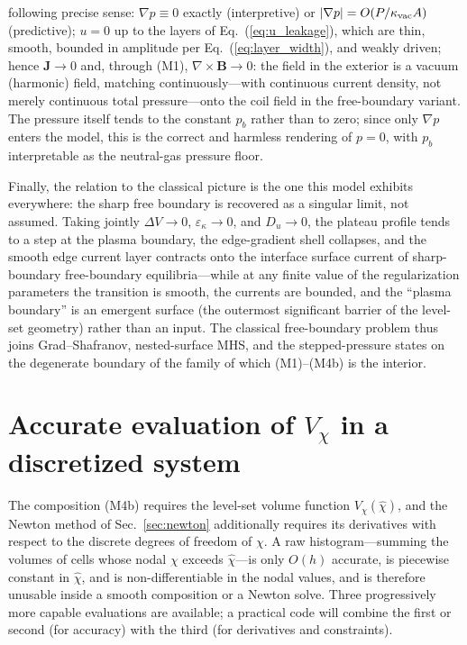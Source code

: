 \documentclass[english]{article}
\newcommand{\bB}{\mathbf{B}}
\newcommand{\bJ}{\mathbf{J}}
\begin{document}
following precise sense: $\nabla p\equiv0$ exactly (interpretive) or
$|\nabla p|=O(P/\kappa_{\rm vac}A)$ (predictive); $u=0$ up to the layers of
Eq.~(\ref{eq:u_leakage}), which are thin, smooth, bounded in amplitude per
Eq.~(\ref{eq:layer_width}), and weakly driven; hence $\bJ\rightarrow0$ and, through (M1),
$\nabla\times\bB\rightarrow0$: the field in the exterior is a vacuum (harmonic) field, matching
continuously---with continuous current density, not merely continuous total pressure---onto the
coil field in the free-boundary variant. The pressure itself tends to the constant $p_b$ rather
than to zero; since only $\nabla p$ enters the model, this is the correct and harmless rendering
of $p=0$, with $p_b$ interpretable as the neutral-gas pressure floor.

Finally, the relation to the classical picture is the one this model exhibits everywhere: the
sharp free boundary is recovered as a singular limit, not assumed. Taking jointly
$\Delta V\rightarrow0$, $\varepsilon_\kappa\rightarrow0$, and $D_u\rightarrow0$, the plateau
profile tends to a step at the plasma boundary, the edge-gradient shell collapses, and the
smooth edge current layer contracts onto the interface surface current of sharp-boundary
free-boundary equilibria---while at any finite value of the regularization parameters the
transition is smooth, the currents are bounded, and the ``plasma boundary'' is an emergent
surface (the outermost significant barrier of the level-set geometry) rather than an input. The
classical free-boundary problem thus joins Grad--Shafranov, nested-surface MHS, and the
stepped-pressure states on the degenerate boundary of the family of which (M1)--(M4b) is the
interior.

\section{Accurate evaluation of $V_\chi$ in a discretized system}
\label{sec:Vchi}

The composition (M4b) requires the level-set volume function $V_\chi(\hat\chi)$, and the Newton
method of Sec.~\ref{sec:newton} additionally requires its derivatives with respect to the discrete
degrees of freedom of $\chi$. A raw histogram---summing the volumes of cells whose nodal $\chi$
exceeds $\hat\chi$---is only $O(h)$ accurate, is piecewise constant in $\hat\chi$, and is
non-differentiable in the nodal values, and is therefore unusable inside a smooth composition or a
Newton solve. Three progressively more capable evaluations are available; a practical code will
combine the first or second (for accuracy) with the third (for derivatives and constraints).
\end{document}
